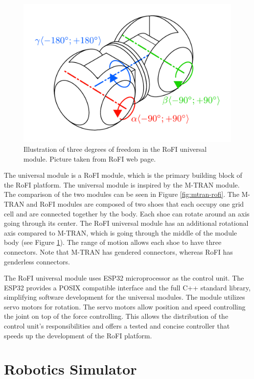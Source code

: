 \documentclass[
  printed, %
  color,   %
  notable, %
  oneside, %
  nolof,   %
  nolot,   %
  nocover,
]{fithesis3}
\begin{document}
\begin{figure}
    \centering
    \includegraphics[height=.4\textheight]{data/rofi_universal_module_dof.pdf}
    \caption{Illustration of three degrees of freedom in the RoFI universal module. Picture taken from RoFI web page\cite{rofi-web}.}
    \label{fig:univ-module-dof}
\end{figure}

The universal module is a RoFI module, which is the primary building block of the RoFI platform.
The universal module is inspired by the M-TRAN\cite{mtran} module.
The comparison of the two modules can be seen in Figure \ref{fig:mtran-rofi}.
The M-TRAN and RoFI modules are composed of two shoes that each occupy one grid cell and are connected together by the body.
Each shoe can rotate around an axis going through its center.
The RoFI universal module has an additional rotational axis compared to M-TRAN, which is going through the middle of the module body (see Figure \ref{fig:univ-module-dof}).
The range of motion allows each shoe to have three connectors.
Note that M-TRAN has gendered connectors, whereas RoFI has genderless connectors.

The RoFI universal module uses ESP32 microprocessor as the control unit.
The ESP32 provides a POSIX compatible interface and the full C++ standard library, simplifying software development for the universal modules.
The module utilizes servo motors for rotation.
The servo motors allow position and speed controlling the joint on top of the force controlling.
This allows the distribution of the control unit's responsibilities and offers a tested and concise controller that speeds up the development of the RoFI platform.


\chapter{Robotics Simulator}
\end{document}
